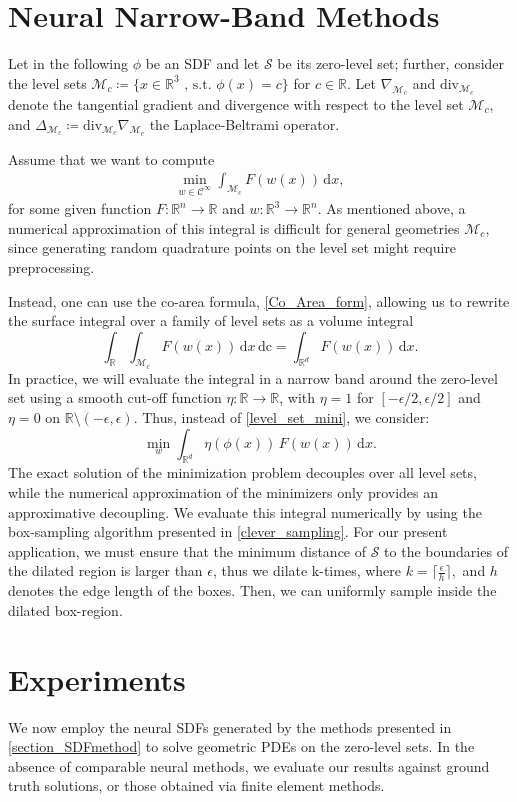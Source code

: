 \documentclass[12pt,openany]{book}
\newcommand{\R}{\mathbb{R}}
\def\S{\mathcal{S}}
\theoremstyle{plainnormal}
\theoremstyle{remark}
\begin{document}
\section{Neural Narrow-Band Methods}
Let in the following $\phi$ be an SDF and let $\S$ be its zero-level set; further, consider the level sets $\mathcal{M}_c \coloneqq \{x\in \R^3 \text{ , s.t. } \phi(x) = c\}$ for $c \in \R$. Let $\nabla_{\mathcal{M}_c}$ and $\mathrm{div}_{\mathcal{M}_c}$ denote the tangential gradient and divergence with respect to the level set $\mathcal M_c$, and $\Delta_{\mathcal M_c} \coloneqq \mathrm{div}_{\mathcal{M}_c}\nabla_{\mathcal{M}_c} $ the Laplace-Beltrami operator.\par
Assume that we want to compute \begin{align}\label{level_set_mini}
    \min_{w\in \mathcal{C}^\infty}\int_{\mathcal{M}_c} F(w(x)) \,\mathrm{d}x,
\end{align} for some given function $F:\R^n \rightarrow\R$ and $w: \R^3 \rightarrow\R^n$. As mentioned above, a numerical approximation of this integral is difficult for general geometries $\mathcal M_c$, since generating random quadrature points on the level set might require preprocessing. \par
Instead, one can use the co-area formula, \cref{Co_Area_form}, allowing us to rewrite the surface integral over a family of level sets as a volume integral
$$\int_\R\int_{\mathcal{M}_c} F(w(x)) \,\mathrm{d}x\,\mathrm{dc}= \int_{\R^d}F(w(x)) \,\mathrm{d}x.$$
In practice, we will evaluate the integral in a narrow band around the zero-level set using a smooth cut-off function $\eta: \R\rightarrow\R$, with $\eta = 1$ for $[-\epsilon/2,\epsilon/2]$ and $\eta = 0$ on $\R \setminus(-\epsilon, \epsilon)$. Thus, instead of \cref{level_set_mini}, we consider: 
$$\min_w \int_{\R^d} \eta(\phi(x))\,F(w(x))  \,\mathrm{d}x.$$
The exact solution of the minimization problem decouples over all level sets, while the numerical approximation of the minimizers only provides an approximative decoupling.
We evaluate this integral numerically by using the box-sampling algorithm presented in \cref{clever_sampling}. For our present application, we must ensure that the minimum distance of $\S$ to the boundaries of the dilated region is larger than $\epsilon$, thus we dilate k-times, where $k = \Big\lceil\frac{\epsilon}{h}\Big\rceil,$
and $h$ denotes the edge length of the boxes. Then, we can uniformly sample inside the dilated box-region.
\section{Experiments}
We now employ the neural SDFs generated by the methods presented in \cref{section_SDFmethod} to solve geometric PDEs on the zero-level sets. In the absence of comparable neural methods, we evaluate our results against ground truth solutions, or those obtained via finite element methods.
\end{document}

